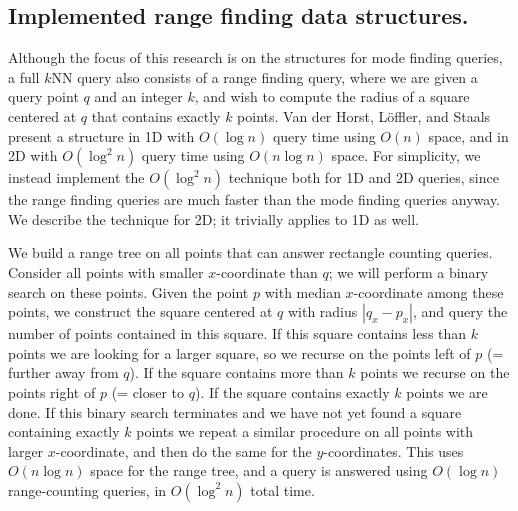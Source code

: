 \documentclass[twoside,leqno,twocolumn]{article}
\begin{document}
\subsection{Implemented range finding data structures.}
\label{sec:Range_finding}
Although the focus of this research is on the structures for mode finding queries, a full $k$NN query also consists of a range finding query, where we are given a query point $q$ and an integer
$k$, and wish to compute the radius of a square centered at
$q$ that contains exactly $k$ points. Van der
Horst, Löffler, and Staals~\cite{chromatic_knn2025} present a structure in 1D with $O(\log n)$ query time using $O(n)$ space, and in 2D with $O(\log^2 n)$ query time using $O(n \log n)$ space. For simplicity, we instead implement the $O(\log^2 n)$ technique both for 1D and 2D queries, since the range finding queries are much faster than the mode finding queries anyway. We describe the technique for 2D; it trivially applies to 1D as well.

We build a range tree on all points that can answer rectangle
counting queries. Consider all points with smaller $x$-coordinate than
$q$; we will perform a binary search on these points. Given the point
$p$ with median $x$-coordinate among these points, we construct the
square centered at $q$ with radius $|q_x - p_x|$, and query the number
of points contained in this square. If this square contains less than
$k$ points we are looking for a larger square, so we recurse on the
points left of $p$ (= further away from $q$). If the square contains more than $k$ points we
recurse on the points right of $p$ (= closer to $q$). If the square
contains exactly $k$ points we are done. If this binary search
terminates and we have not yet found a square containing exactly $k$
points we repeat a similar procedure on all points with larger
$x$-coordinate, and then do the same for the $y$-coordinates. This
uses $O(n \log n)$ space for the range tree, and a query is answered
using $O(\log n)$ range-counting queries, in $O(\log^2 n)$ total time.
\end{document}
